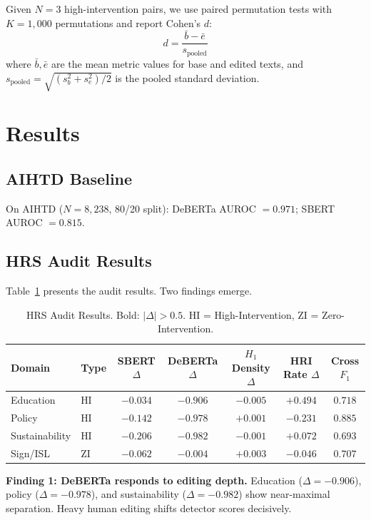 \documentclass[conference]{IEEEtran}
\begin{document}
Given $N = 3$ high-intervention pairs, we use paired permutation tests with $K = 1{,}000$ permutations and report Cohen's $d$:
\begin{equation}
    d = \frac{\bar{b} - \bar{e}}{s_{\text{pooled}}}
\end{equation}
where $\bar{b}, \bar{e}$ are the mean metric values for base and edited texts, and $s_{\text{pooled}} = \sqrt{(s_b^2 + s_e^2)/2}$ is the pooled standard deviation.

\section{Results}

\subsection{AIHTD Baseline}

On AIHTD ($N = 8{,}238$, 80/20 split): DeBERTa AUROC $= 0.971$; SBERT AUROC $= 0.815$.

\subsection{HRS Audit Results}

Table~\ref{tab:hrs} presents the audit results. Two findings emerge.

\begin{table}[t]
\centering
\caption{HRS Audit Results. Bold: $|\Delta| > 0.5$. HI = High-Intervention, ZI = Zero-Intervention.}
\label{tab:hrs}
\small
\begin{tabular}{llccccc}
\toprule
\textbf{Domain} & \textbf{Type} & \textbf{SBERT $\Delta$} & \textbf{DeBERTa $\Delta$} & \textbf{$H_1$ Density $\Delta$} & \textbf{HRI Rate $\Delta$} & \textbf{Cross $F_1$} \\
\midrule
Education       & HI   & $-0.034$ & $\mathbf{-0.906}$ & $-0.005$ & $+0.494$ & $0.718$ \\
Policy          & HI   & $-0.142$ & $\mathbf{-0.978}$ & $+0.001$ & $-0.231$ & $0.885$ \\
Sustainability  & HI   & $-0.206$ & $\mathbf{-0.982}$ & $-0.001$ & $+0.072$ & $0.693$ \\
\midrule
Sign/ISL        & ZI   & $-0.062$ & $-0.004$          & $+0.003$ & $-0.046$ & $0.707$ \\
\bottomrule
\end{tabular}
\end{table}

\textbf{Finding 1: DeBERTa responds to editing depth.} Education ($\Delta = -0.906$), policy ($\Delta = -0.978$), and sustainability ($\Delta = -0.982$) show near-maximal separation. Heavy human editing shifts detector scores decisively.
\end{document}
